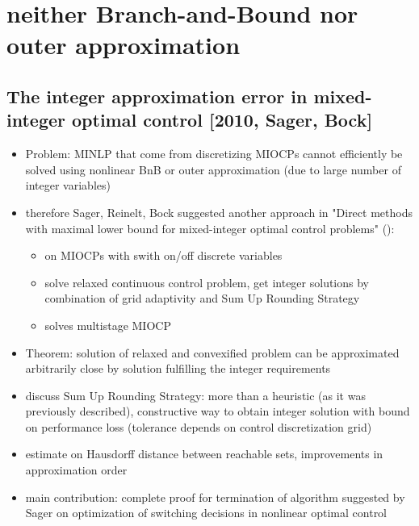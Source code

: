 \documentclass{article}
\begin{document}
\section{neither Branch-and-Bound nor outer approximation}
\subsection{The integer approximation error in mixed-integer optimal control [2010, Sager, Bock]}
\begin{itemize}
\item Problem: MINLP that come from discretizing MIOCPs cannot efficiently be solved using nonlinear BnB or outer approximation (due to large number of integer variables)
\item therefore Sager, Reinelt, Bock suggested another approach in "Direct methods with maximal lower bound for mixed-integer optimal control problems" (\cite{sager2009direct}):
	\begin{itemize}
	\item on MIOCPs with swith on/off discrete variables
	\item solve relaxed continuous control problem, get integer solutions by combination of grid adaptivity and Sum Up Rounding Strategy
	\item solves multistage MIOCP
\end{itemize}	 
\item Theorem: solution of relaxed and convexified problem can be approximated arbitrarily close by solution fulfilling the integer requirements
\item discuss Sum Up Rounding Strategy: more than a heuristic (as it was previously described), constructive way to obtain integer solution with bound on performance loss (tolerance depends on control discretization grid)
\item estimate on Hausdorff distance between reachable sets, improvements in approximation order
\item main contribution: complete proof for termination of algorithm suggested by Sager on optimization of switching decisions in nonlinear optimal control
\end{itemize}
\end{document}
